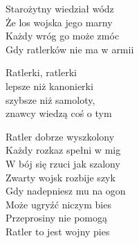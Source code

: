 \begin{text}
    Starożytny wiedział wódz\\
    Że los wojska jego marny\\
    Każdy wróg go może zmóc\\
    Gdy ratlerków nie ma w armii

    \vin Ratlerki, ratlerki\\
    \vin lepsze niż kanonierki\\
    \vin szybsze niż samoloty,\\
    \vin znawcy wiedzą coś o tym

    Ratler dobrze wyszkolony\\
    Każdy rozkaz spełni w mig\\
    W bój się rzuci jak szalony\\
    Zwarty wojsk rozbije szyk\\
    Gdy nadepniesz mu na ogon\\
    Może ugryźć niczym bies\\
    Przeprosiny nie pomogą\\
    Ratler to jest wojny pies
\end{text}
\begin{chord}

\end{chord}